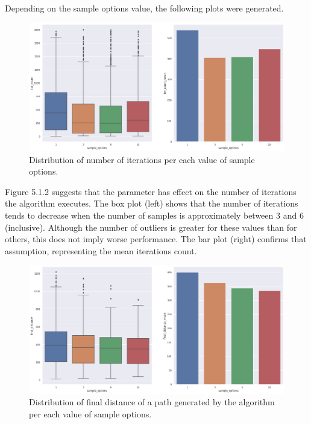 \documentclass[a4paper,12pt]{article}
\DeclareRobustCommand{\[}{\begin{equation}}
\DeclareRobustCommand{\]}{\end{equation}}
\numberwithin{equation}{section}
\numberwithin{algorithm}{section}
\begin{document}
Depending on the sample options value, the following plots were generated.
\begin{figure}[H]
\begin{center}
\includegraphics[scale=0.4]{images/so_iter_count.png}
\captionsetup{width=0.6\textwidth}
\caption{Distribution of number of iterations per each value of sample options.}
\end{center}
\end{figure}
Figure 5.1.2 suggests that the parameter has effect on the number of iterations the algorithm executes. The box plot (left) shows that the number of iterations tends to decrease when the number of samples is approximately between 3 and 6 (inclusive). Although the number of outliers is greater for these values than for others, this does not imply worse performance. The bar plot (right) confirms that assumption, representing the mean iterations count.
\begin{figure}[H]
\begin{center}
\includegraphics[scale=0.4]{images/so_final_distance.png}
\captionsetup{width=0.6\textwidth}
\caption{Distribution of final distance of a path generated by the algorithm per each value of sample options.}
\end{center}
\end{figure}
\end{document}
